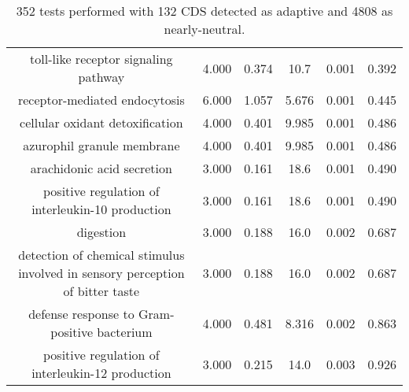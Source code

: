 \documentclass[USLetter,5pt]{article}
\begin{document}
\begin{table}[ht]
\begin{adjustbox}{width = 1\textwidth}
\begin{tabular}{|c|c|c|c|c|c|}
toll-like receptor signaling pathway &  4.000 &  0.374 &   10.7 &  0.001 &  0.392\\
receptor-mediated endocytosis &  6.000 &  1.057 &  5.676 &  0.001 &  0.445\\
cellular oxidant detoxification &  4.000 &  0.401 &  9.985 &  0.001 &  0.486\\
azurophil granule membrane &  4.000 &  0.401 &  9.985 &  0.001 &  0.486\\
arachidonic acid secretion &  3.000 &  0.161 &   18.6 &  0.001 &  0.490\\
positive regulation of interleukin-10 production &  3.000 &  0.161 &   18.6 &  0.001 &  0.490\\
digestion &  3.000 &  0.188 &   16.0 &  0.002 &  0.687\\
detection of chemical stimulus involved in sensory perception of bitter taste &  3.000 &  0.188 &   16.0 &  0.002 &  0.687\\
defense response to Gram-positive bacterium &  4.000 &  0.481 &  8.316 &  0.002 &  0.863\\
positive regulation of interleukin-12 production &  3.000 &  0.215 &   14.0 &  0.003 &  0.926\\
\hline
\end{tabular}
\end{adjustbox}
\caption{352 tests performed with 132 CDS detected as adaptive and 4808 as nearly-neutral.
}
\end{table}
\end{document}
